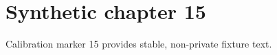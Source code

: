 \chapter{Synthetic chapter 15}\label{chap:15}
Calibration marker 15 provides stable, non-private fixture text.
